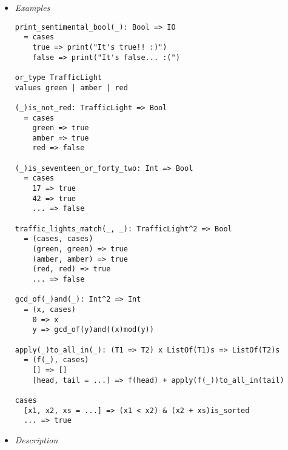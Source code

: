 \documentclass{article}
\begin{document}
\begin{itemize}
\item \textit{Examples}

\begin{verbatim}
print_sentimental_bool(_): Bool => IO
  = cases
    true => print("It's true!! :)")
    false => print("It's false... :(")

or_type TrafficLight
values green | amber | red

(_)is_not_red: TrafficLight => Bool
  = cases
    green => true
    amber => true
    red => false

(_)is_seventeen_or_forty_two: Int => Bool
  = cases
    17 => true
    42 => true
    ... => false

traffic_lights_match(_, _): TrafficLight^2 => Bool
  = (cases, cases)
    (green, green) => true
    (amber, amber) => true
    (red, red) => true
    ... => false

gcd_of(_)and(_): Int^2 => Int
  = (x, cases)
    0 => x
    y => gcd_of(y)and((x)mod(y))

apply(_)to_all_in(_): (T1 => T2) x ListOf(T1)s => ListOf(T2)s
  = (f(_), cases)
    [] => []
    [head, tail = ...] => f(head) + apply(f(_))to_all_in(tail)

cases
  [x1, x2, xs = ...] => (x1 < x2) & (x2 + xs)is_sorted
  ... => true
\end{verbatim}

\newpage

\item \textit{Description}


\end{itemize}
\end{document}
